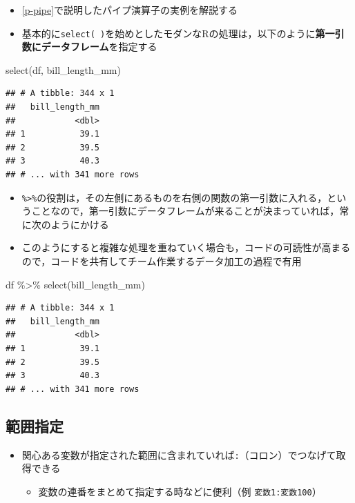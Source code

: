 \documentclass[
  xelatex,ja=standard, b5paper]{bxjsbook}
\newenvironment{Shaded}{\begin{snugshade}}{\end{snugshade}}
\newcommand{\FunctionTok}[1]{\textcolor[rgb]{0.00,0.00,0.00}{#1}}
\newcommand{\NormalTok}[1]{#1}
\newcommand{\SpecialCharTok}[1]{\textcolor[rgb]{0.00,0.00,0.00}{#1}}
\providecommand{\tightlist}{%
  \setlength{\itemsep}{0pt}\setlength{\parskip}{0pt}}
\begin{document}
\begin{itemize}
\tightlist
\item
  \ref{p-pipe}で説明したパイプ演算子の実例を解説する
\item
  基本的に\texttt{select(\ )}を始めとしたモダンなRの処理は，以下のように\textbf{第一引数にデータフレーム}を指定する
\end{itemize}

\begin{Shaded}
\begin{Highlighting}[]
\FunctionTok{select}\NormalTok{(df, bill\_length\_mm)}
\end{Highlighting}
\end{Shaded}

\begin{verbatim}
## # A tibble: 344 x 1
##   bill_length_mm
##            <dbl>
## 1           39.1
## 2           39.5
## 3           40.3
## # ... with 341 more rows
\end{verbatim}

\begin{itemize}
\tightlist
\item
  \texttt{\%\textgreater{}\%}の役割は，その左側にあるものを右側の関数の第一引数に入れる，ということなので，第一引数にデータフレームが来ることが決まっていれば，常に次のようにかける
\item
  このようにすると複雑な処理を重ねていく場合も，コードの可読性が高まるので，コードを共有してチーム作業するデータ加工の過程で有用
\end{itemize}

\begin{Shaded}
\begin{Highlighting}[]
\NormalTok{df }\SpecialCharTok{\%\textgreater{}\%} 
  \FunctionTok{select}\NormalTok{(bill\_length\_mm)}
\end{Highlighting}
\end{Shaded}

\begin{verbatim}
## # A tibble: 344 x 1
##   bill_length_mm
##            <dbl>
## 1           39.1
## 2           39.5
## 3           40.3
## # ... with 341 more rows
\end{verbatim}

\hypertarget{select-range}{%
\subsection{範囲指定}\label{select-range}}

\begin{itemize}
\tightlist
\item
  関心ある変数が指定された範囲に含まれていれば\texttt{:}（コロン）でつなげて取得できる

  \begin{itemize}
  \tightlist
  \item
    変数の連番をまとめて指定する時などに便利（例 \texttt{変数1:変数100}）
  \end{itemize}
\end{itemize}
\end{document}

